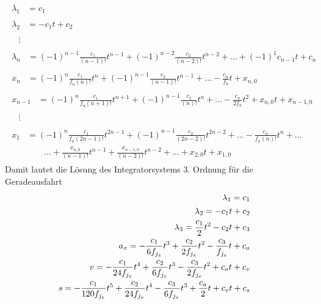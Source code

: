 \begin{align}
\begin{split}
\lambda_1 &= c_1 
\end{split}
\\
\begin{split}
\lambda_2 &= -c_1t + c_2 
\end{split}
\\
\begin{split}
&\vdots 
\end{split}
\\
\begin{split}
\lambda_n &= (-1)^{n-1}\frac{c_1}{(n-1)!}t^{n-1} + (-1)^{n-2}\frac{c_2}{(n-2)!}t^{n-2} + ... + (-1)^1c_{n-1}t + c_n 
\end{split}
\\
\begin{split}
x_n &= (-1)^n\frac{c_1}{f_u(n)!}t^{n} + (-1)^{n-1}\frac{c_2}{(n-1)!}t^{n-1} + ... - \frac{c_{n}}{f_u}t + x_{n,0} 
\end{split}
\\
\begin{split}
x_{n-1} &= (-1)^n\frac{c_1}{f_u(n+1)!}t^{n+1} + (-1)^{n-1}\frac{c_2}{(n)!}t^{n} + ... - \frac{c_{n}}{2f_u}t^2 + x_{n,0}t + x_{n-1,0} 
\end{split}
\\
\begin{split}
&\vdots 
\end{split}
\\
\begin{split}
x_{1} &= (-1)^n\frac{c_1}{f_u(2n-1)!}t^{2n-1} + (-1)^{n-1}\frac{c_2}{(2n-2)!}t^{2n-2} + ... - \frac{c_{n}}{f_u(n)!}t^n + ... \\
&\qquad ... + \frac{x_{n,0}}{(n-1)!}t^{n-1} + \frac{x_{n-1,0}}{(n-2)!}t^{n-2} + ... + x_{2,0}t + x_{1,0}
\end{split}
\end{align}
Damit lautet die Lösung des Integratorsystems 3. Ordnung für die Geradeausfahrt
\begin{align}
\begin{split}
\lambda_1 &= c_1 
\end{split}
\\
\begin{split}
\lambda_2 &= -c_1t + c_2 
\end{split}
\\
\begin{split}
\lambda_3 &= \frac{c_1}{2}t^2 - c_2t + c_3 
\end{split}
\\
\begin{split}
a_x &= -\frac{c_1}{6f_{j_x}}t^3 + \frac{c_2}{2f_{j_x}}t^2 - \frac{c_3}{f_{j_x}}t + c_a
\end{split}
\\
\begin{split}
v &= -\frac{c_1}{24f_{j_x}}t^4 + \frac{c_2}{6f_{j_x}}t^3 - \frac{c_3}{2f_{j_x}}t^2 + c_at + c_v
\end{split}
\\
\begin{split}
s &= -\frac{c_1}{120f_{j_x}}t^5 + \frac{c_2}{24f_{j_x}}t^4 - \frac{c_3}{6f_{j_x}}t^3 + \frac{c_a}{2}t + c_vt + c_s
\end{split}
\end{align}
